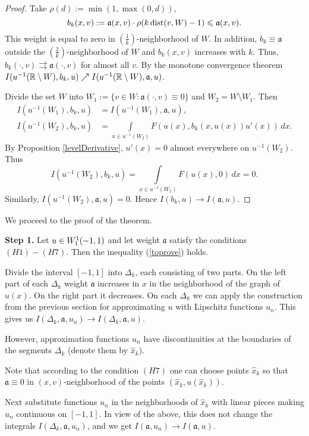 \begin{proof}
Take $\rho(d) := \min(1, \max(0, d))$,
$$b_k(x, v) := \mathfrak a(x, v) \cdot \rho(k \mathop{\rm dist}\nolimits(v, W) - 1) \leqslant \mathfrak a(x, v).$$
This weight is equal to zero in $\left(\frac{1}{k}\right)$-neighborhood of $W$.
In addition, $b_k \equiv \mathfrak a$ outside the $\left(\frac{2}{k}\right)$-neighborhood of $W$ and
$b_k(x, v)$ increases with $k$.
Thus, $b_k(\cdot, v) \rightrightarrows \mathfrak a(\cdot, v)$ for almost all $v$.
By the monotone convergence theorem
$I(u^{-1}(\mathbb R \setminus W), b_k, u) \nearrow I(u^{-1}(\mathbb R \setminus W), \mathfrak a, u)$.

Divide the set $W$ into $W_1 := \{v \in W: \mathfrak a(\cdot, v) \equiv 0\}$ and $W_2 = W \setminus W_1$.
Then
$$
\begin{aligned}
I(u^{-1}(W_1), b_k, u) &= I(u^{-1}(W_1), \mathfrak a, u),\\
I(u^{-1}(W_2), b_k, u) &= \int\limits_{x \in u^{-1}(W_2)} F(u(x), b_k(x, u(x)) u'(x)) \, dx.
\end{aligned}
$$
By Proposition \ref{levelDerivative}, $u'(x) = 0$ almost everywhere on $u^{-1}(W_2)$.
Thus
$$I(u^{-1}(W_2), b_k, u) = \int\limits_{x \in u^{-1}(W_2)} F(u(x), 0) \, dx = 0.$$
Similarly, $I(u^{-1}(W_2), \mathfrak a, u) = 0$. Hence $I(b_k, u) \to I(\mathfrak a, u)$.
\end{proof}

We proceed to the proof of the theorem.

\bigskip
{\bf Step 1.} Let $u \in W_1^1(-1, 1)$ and let weight $\mathfrak a$ satisfy the conditions $(H1)-(H7)$.
Then the inequality (\ref{toprove}) holds.

Divide the interval $[-1, 1]$ into $\Delta_k$, each consisting of two parts.
On the left part of each $\Delta_k$ weight $\mathfrak a$ increases in $x$ in the neighborhood
of the graph of $u(x)$. On the right part it decreases.
On each $\Delta_k$ we can apply the construction from the previous section
for approximating $u$ with Lipschitz functions $u_n$.
This gives us $I(\Delta_k, \mathfrak a, u_n) \to I(\Delta_k, \mathfrak a, u)$.

However, approximation functions $u_n$ have discontinuities at the boundaries of the segments $\Delta_k$
(denote them by $\hat{x}_k$).

Note that according to the condition $(H7)$ one can choose points $\hat{x}_k$ so
that $\mathfrak a \equiv 0$ in $(x, v)$-neighborhood of the points $(\hat{x}_k, u(\hat{x}_k))$.

Next substitute functions $u_n$ in the neighborhoods of $\hat{x}_k$ with linear pieces
making $u_n$ continuous on $[-1, 1]$.
In view of the above, this does not change the integrals $I(\Delta_k, \mathfrak a, u_n)$,
and we get $I(\mathfrak a, u_n) \to I(\mathfrak a, u)$.

